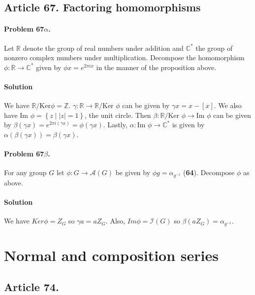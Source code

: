 \subsection{Article 67. Factoring homomorphisms}

\paragraph{Problem 67$\alpha$.}
Let $\mathbb{R}$ denote the group of real numbers under addition and
$\mathbb{C}^*$ the group of nonzero complex numbers under multiplication.
Decompose the homomorphism $ \phi : \mathbb{R} \rightarrow \mathbb{C}^*$
given by $\phi x = e^{2 \pi i x}$ in the manner of the proposition above.

\paragraph*{Solution}
We have $\mathbb{R} / \mbox{Ker} \phi = \mathbb{Z}$. $\gamma : \mathbb{R} \rightarrow
\mathbb{R} / \mbox{Ker } \phi $ can be given by $ \gamma x = x - [x] $. We also
have $ \mbox{Im } \phi = \left\{ z \mid |z| = 1\right\}$, the unit circle. Then
$\beta : \mathbb{R} / \mbox{Ker } \phi \rightarrow \mbox{Im } \phi $ can be
given by $ \beta (\gamma x) = e^{2\pi i (\gamma x)} = \phi (\gamma x)$.
Lastly, $\alpha : \mbox{Im } \phi \rightarrow \mathbb{C}^* $ is given by
$ \alpha ( \beta ( \gamma x ) ) = \beta (\gamma x) $.

\paragraph{Problem 67$\beta$.}
For any group $G$ let $\phi: G \rightarrow \mathcal{A}(G)$ be given by
$\phi g = \alpha_{g^{-1}}$ (\textbf{64}). Decompose $\phi$ as above.

\paragraph*{Solution}
We have $Ker \phi = Z_G$ so $\gamma a = aZ_G$. Also, $Im \phi = \mathcal{I}(G)$
so $\beta (aZ_G) = \alpha_{g^{-1}}$.

\section{Normal and composition series}

\subsection{Article 74.}

